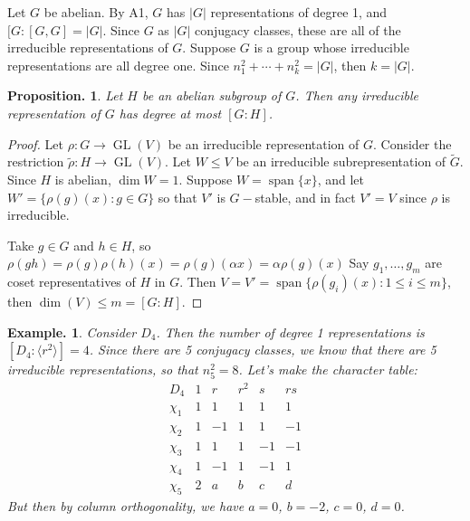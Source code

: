\documentclass[11pt, a4paper]{memoir}
\theoremstyle{change}
\newtheorem{proposition}[theorem]{Proposition.}
\theoremstyle{plain}
\theoremstyle{nonumberplain}
\newtheorem{example}{Example.}
\newtheorem{proof}{Proof}
\DeclareMathOperator{\GL}{GL}
\DeclareMathOperator{\spn}{span}
\numberwithin{equation}{section}
\begin{document}
Let $G$ be abelian.
By A1, $G$ has $|G|$ representations of degree 1, and $[G:[G,G]=|G|$.
Since $G$ as $|G|$ conjugacy classes, these are all of the irreducible representations of $G$.
Suppose $G$ is a group whose irreducible representations are all degree one.
Since $n_1^2+\cdots+n_k^2=|G|$, then $k=|G|$.
\begin{proposition}
    Let $H$ be an abelian subgroup of $G$.
    Then any irreducible representation of $G$ has degree at most $[G:H]$.
\end{proposition}
\begin{proof}
    Let $\rho:G\to\GL(V)$ be an irreducible representation of $G$.
    Consider the restriction $\tilde\rho:H\to\GL(V)$.
    Let $W\leq V$ be an irreducible subrepresentation of $\tilde G$.
    Since $H$ is abelian, $\dim W=1$.
    Suppose $W=\spn\{x\}$, and let $W'=\{\rho(g)(x):g\in G\}$ so that $V'$ is $G-$stable, and in fact $V'=V$ since $\rho$ is irreducible.

    Take $g\in G$ and $h\in H$, so $\rho(gh)=\rho(g)\rho(h)(x)=\rho(g)(\alpha x)=\alpha\rho(g)(x)$
    Say $g_1,\ldots,g_m$ are coset representatives of $H$ in $G$.
    Then $V=V'=\spn\{\rho(g_i)(x):1\leq i\leq m\}$, then $\dim(V)\leq m=[G:H]$.
\end{proof}
\begin{example}
    Consider $D_4$.
    Then the number of degree 1 representations is $[D_4:\langle r^2\rangle]=4$.
    Since there are 5 conjugacy classes, we know that there are 5 irreducible representations, so that $n_5^2=8$.
    Let's make the character table:
    \begin{equation*}
        \begin{array}{c|ccccc}
            D_4    & 1 & r &r^2& s & rs\\
            \hline
            \chi_1 & 1 & 1 & 1 & 1 & 1\\
            \hline
            \chi_2 & 1 &-1 & 1 & 1 &-1\\
            \hline
            \chi_3 & 1 & 1 & 1 &-1 &-1\\
            \hline
            \chi_4 & 1 &-1 & 1 &-1 & 1\\
            \hline
            \chi_5 & 2 & a & b & c & d
        \end{array}
    \end{equation*}
    But then by column orthogonality, we have $a=0$, $b=-2$, $c=0$, $d=0$.
\end{example}
\end{document}
